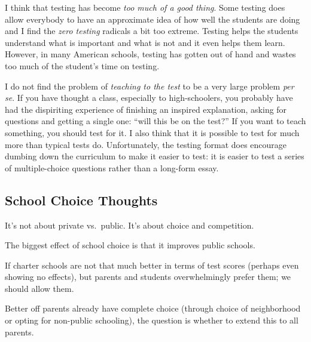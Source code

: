 I think that testing has become \emph{too much of a good thing}. Some testing
does allow everybody to have an approximate idea of how well the students are
doing and I find the \emph{zero testing} radicals a bit too extreme. Testing
helps the students understand what is important and what is not and it even
helps them learn.  However, in many
American schools, testing has gotten out of hand and wastes too much of
the student's time on testing.

I do not find the problem of \emph{teaching to the test} to be a very large
problem \emph{per se}. If you have thought a class, especially to
high-schoolers, you probably have had the dispiriting experience of finishing
an inspired explanation, asking for questions and getting a single one: ``will
this be on the test?'' If you want to teach something, you should test for it.
I also think that it is possible to test for much more than typical tests do.
Unfortunately, the testing format does encourage dumbing down the curriculum to
make it easier to test: it is easier to test a series of multiple-choice
questions rather than a long-form essay.

\subsection{School Choice Thoughts}

\thought It's not about private vs.\ public. It's about choice and competition.

\thought The biggest effect of school choice is that it improves public schools.

\thought If charter schools are not that much better in terms of test scores
(perhaps even showing no effects), but parents and students overwhelmingly
prefer them; we should allow them.

\thought Better off parents already have complete choice (through choice of
neighborhood or opting for non-public schooling), the question is whether to
extend this to all parents.

